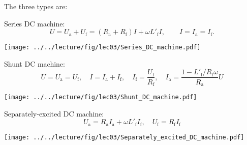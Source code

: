 



\begin{solutionblock}
The three types are:

Series DC machine:
$$ U = U_\mathrm{a} + U_\mathrm{f} = (R_\mathrm{a} + R_\mathrm{f}) I + \omega L'_\mathrm{f} I, \qquad I = I_\mathrm{a} = I_\mathrm{f}.$$ 
\begin{center}
    \texttt{[image: ../../lecture/fig/lec03/Series\_DC\_machine.pdf]}
\end{center}

Shunt DC machine:
$$ U = U_\mathrm{a} = U_\mathrm{f}, \quad I = I_\mathrm{a} + I_\mathrm{f}, \quad I_\mathrm{f} = \frac{U_\mathrm{f}}{R_\mathrm{f}}, \quad I_\mathrm{a} = \frac{1-L'_\mathrm{f}/R_\mathrm{f}\omega}{R_\mathrm{a}}U$$
\begin{center}
    \texttt{[image: ../../lecture/fig/lec03/Shunt\_DC\_machine.pdf]}
\end{center}

Separately-excited DC machine:
$$ U_\mathrm{a} = R_\mathrm{a} I_\mathrm{a} + \omega L'_\mathrm{f} I_\mathrm{f}, \quad U_\mathrm{f} = R_\mathrm{f} I_\mathrm{f}$$
\begin{center}
    \texttt{[image: ../../lecture/fig/lec03/Separately\_excited\_DC\_machine.pdf]}
\end{center}
\end{solutionblock}


